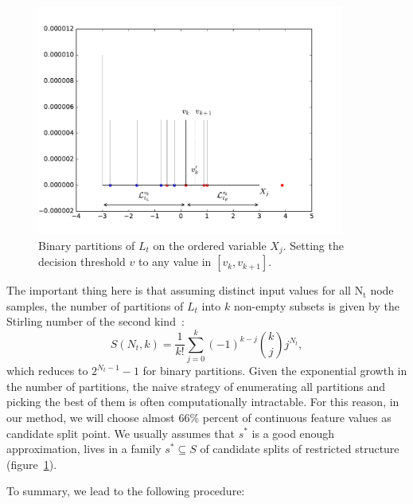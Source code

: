 \documentclass[master]{IPSstyle}
\begin{document}
{\begin{figure}[H]
    \centering
    \includegraphics[width=0.9\textwidth]{figures/ch3_split_ordered.pdf}
    \caption{Binary partitions of $L_t$ on the ordered variable $X_j$. Setting the decision threshold $v$ to any value in $[v_k,v_{k+1}]$.}
    \label{fig:3:split_ordered}
\end{figure}
The important thing here is that assuming distinct input values for all $\mathrm{N_t}$ node samples, the number of partitions of ${L_t}$ into $k$ non-empty subsets is given by the Stirling number of the second kind~\cite{knuth1992problem}:
\begin{equation}
S(N_t, k) = \frac{1}{k!}\sum_{j=0}^k(-1)^{k-j} {k\choose j} j^{N_t},
\end{equation} 
which reduces to $2^{N_t-1}-1$ for binary partitions. Given the exponential growth in the number of partitions, the naive strategy of enumerating all partitions and picking the best of them is often computationally intractable. For this reason, in our method, we will choose almost 66\% percent of continuous feature values as candidate split point. We usually assumes that $s^*$ is a good enough approximation, lives in a family $s^* \subseteq {S}$ of candidate splits of restricted structure (figure~\ref{fig:3:split_ordered}). 

To summary, we lead to the following procedure:


}
\end{document}

